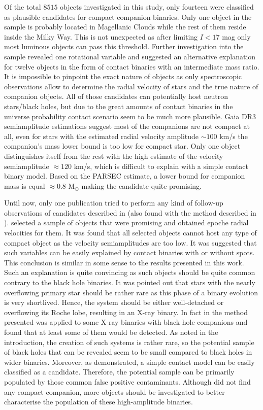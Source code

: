 \documentclass{pracalicmgr}
\begin{document}
Of the total $8515$ objects investigated in this study, only fourteen were classified as plausible candidates for compact companion binaries.
Only one object in the sample is probably located in Magellanic Clouds while the rest of them reside inside the Milky Way. 
This is not unexpected as after limiting $I<17$ mag only most luminous objects can pass this threshold.
Further investigation into the sample revealed one rotational variable and suggested an alternative explanation for twelve objects in the form of
contact binaries with an intermediate mass ratio. It is impossible to pinpoint the exact nature of objects as only spectroscopic observations allow to determine the 
radial velocity of stars and the true nature of companion objects. All of those candidates can potentially host neutron stars/black holes, but
due to the great amounts of contact binaries in the universe probability contact scenario seem to be much more plausible.
Gaia DR3 semiamplitude estimations suggest most of the companions are not compact at all, even for stars with the estimated radial velocity amplitude $\sim100$ km/s
the companion's mass lower bound is too low for compact star.
Only one object distinguishes itself from the rest with the high estimate of the velocity semiamplitude $\approx120$ km/s, which is difficult to explain with a simple contact binary model. 
Based on the PARSEC estimate, a lower bound for companion mass is equal $\approx0.8$ M$_{\odot}$ making the candidate quite promising. 

Until now, only one publication tried to perform any kind of follow-up observations of candidates described in \citet{gomel_gaia_2022} (also 
found with the method described in \citet{gomel_search_2021-2}). \citet{nagarajan_spectroscopic_2023} selected a sample of objects that were promising
and obtained epoche radial velocities for them. It was found that all selected objects cannot host any type of compact object as the velocity semiamplitudes are too low.
It was suggested that such variables can be easily explained by contact binaries with or without spots. This conclusion is similar in some sense to the results presented in this work.
Such an explanation is quite convincing as such objects should be quite common contrary to the black hole binaries. It was pointed out that stars with the nearly overflowing
primary star should be rather rare as this phase of a binary evolution is very shortlived. Hence, the system should be either well-detached or overflowing its Roche lobe,
resulting in an X-ray binary.  In fact in \citet{gomel_search_2021-2} the method presented was applied to some X-ray binaries with black hole companions and
found that at least some of them would be detected.
As noted in the introduction, the creation of such systems is rather rare, so the potential sample of black holes that can be revealed seem
to be small compared to black holes in wider binaries.
Moreover, as demonstrated, a simple contact model can be easily classified as a candidate. 
Therefore, the potential sample can be primarily populated by those common false positive contaminants.
Although \citet{nagarajan_spectroscopic_2023} did not find any compact companion,
more objects should be investigated to better characterise the population of these high-amplitude binaries.
\end{document}
